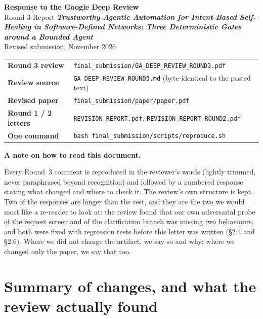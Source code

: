 \documentclass[11pt,a4paper]{article}
\begin{document}
\begin{titlepage}
\vspace*{2.8cm}
{\color{ink}\Huge\bfseries Response to the Google Deep Review\\[0.3em]\bigskip}
{\color{ink}\Large Round 3 Report\bigskip}
{\color{ink}\large\bfseries
\emph{Trustworthy Agentic Automation for Intent-Based Self-Healing in
Software-Defined Networks: Three Deterministic Gates around a Bounded Agent}\\[0.6em]}
{\large Revised submission, November 2026}

\vspace{1.2cm}
\begin{tabular}{@{}ll@{}}
\toprule
\textbf{Round 3 review} & \texttt{final\_submission/GA\_DEEP\_REVIEW\_ROUND3.pdf} \\
\textbf{Review source} & \texttt{GA\_DEEP\_REVIEW\_ROUND3.md} (byte-identical to the pasted text) \\
\textbf{Revised paper} & \texttt{final\_submission/paper/paper.pdf} \\
\textbf{Round 1 / 2 letters} & \texttt{REVISION\_REPORT.pdf}, \texttt{REVISION\_REPORT\_ROUND2.pdf} \\
\textbf{One command} & \texttt{bash final\_submission/scripts/reproduce.sh} \\
\bottomrule
\end{tabular}

\vspace{1.5cm}
\noindent\textbf{A note on how to read this document.}

Every Round~3 comment is reproduced in the reviewer's words (lightly
trimmed, never paraphrased beyond recognition) and followed by a numbered
response stating what changed and where to check it. The review's own
structure is kept. Two of the responses are longer than the rest, and they
are the two we would most like a re-reader to look at: the review found
that our own adversarial probe of the request screen and of the
clarification branch was missing two behaviours, and both were fixed with
regression tests before this letter was written (\S2.4 and \S2.6). Where we
did not change the artifact, we say so and why; where we changed only the
paper, we say that too.

\vfill
\end{titlepage}

\section{Summary of changes, and what the review actually found}
\end{document}
